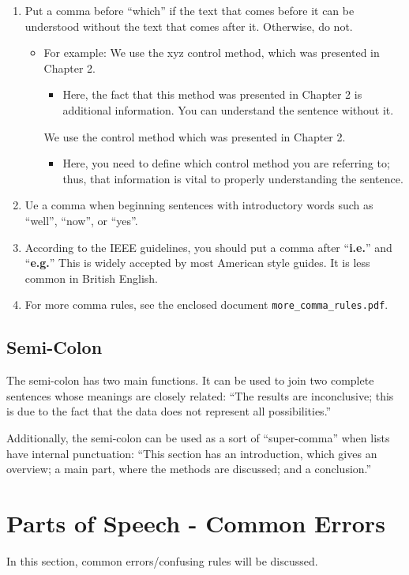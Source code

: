 \begin{enumerate}
 \item Put a comma before ``which'' if the text that comes before it can be understood without the text that comes after it. Otherwise, do not.
 \begin{itemize}
 	\item For example: We use the xyz control method, which was presented in Chapter 2.
 \begin{itemize}
 	\item Here, the fact that this method was presented in Chapter 2 is additional information. You can understand the sentence without it.
 \end{itemize}
We use the control method which was presented in Chapter 2.
\begin{itemize}
	\item Here, you need to define which control method you are referring to; thus, that information is vital to properly understanding the sentence. 
\end{itemize}
 \end{itemize}
\item Ue a comma when beginning sentences with introductory words such as ``well'', ``now'', or ``yes''.
\item According to the IEEE guidelines, you should put a comma after ``\textbf{i.e.}'' and ``\textbf{e.g.}'' This is widely accepted by most American style guides. It is less common in British English. 
\item For more comma rules, see the enclosed document \texttt{more\_comma\_rules.pdf}.
\end{enumerate}

\subsection{Semi-Colon}
The semi-colon has two main functions. It can be used to join two complete sentences whose meanings are closely related: ``The results are inconclusive; this is due to the fact that the data does not represent all possibilities.''

Additionally, the semi-colon can be used as a sort of ``super-comma'' when lists have internal punctuation: ``This section has an introduction, which gives an overview; a main part, where the methods are discussed; and a conclusion.'' 


\section{Parts of Speech - Common Errors}
In this section, common errors/confusing rules will be discussed.
